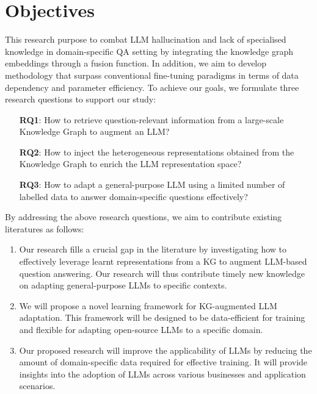 \section*{Objectives}
This research purpose to combat LLM hallucination and lack of specialised knowledge in domain-specific QA setting by integrating the knowledge graph embeddings through a fusion function. 
In addition, we aim to develop methodology that surpass conventional fine-tuning paradigms in terms of data dependency and parameter efficiency. 
To achieve our goals, we formulate three research questions to support our study: 
\vspace{-0.5cm}
\begin{itemize}
    \item[\textbf{RQ1}:] How to retrieve question-relevant information from a large-scale Knowledge Graph to augment an LLM?
    \item[\textbf{RQ2}:] How to inject the heterogeneous representations obtained from the Knowledge Graph to enrich the LLM representation space?
    \item[\textbf{RQ3}:] How to adapt a general-purpose LLM using a limited number of labelled data to answer domain-specific questions effectively?
\end{itemize}
\vspace{-0.3cm}

By addressing the above research questions, we aim to contribute existing literatures as follows:\vspace{-0.3cm}
\begin{enumerate}
    \item Our research fills a crucial gap in the literature by investigating how to effectively leverage learnt representations from a KG to augment LLM-based question answering. Our research will thus contribute timely new knowledge on adapting general-purpose LLMs to specific contexts.

    \item We will propose a novel learning framework for KG-augmented LLM adaptation. This framework will be designed to be data-efficient for training and flexible for adapting open-source LLMs to a specific domain.

    \item Our proposed research will improve the applicability of LLMs by reducing the amount of domain-specific data required for effective training. It will provide insights into the adoption of LLMs across various businesses and application scenarios.
    
\end{enumerate}

